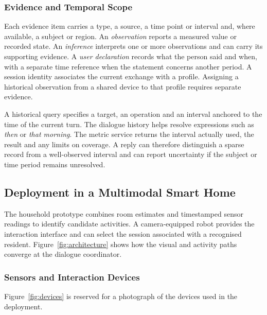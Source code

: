 \documentclass[a4paper,twoside]{article}
\begin{document}
\subsubsection{Evidence and Temporal Scope}
\label{subsec:evidence-method}

Each evidence item carries a type, a source, a time point or interval and, where available, a subject or region. An \emph{observation} reports a measured value or recorded state. An \emph{inference} interprets one or more observations and can carry its supporting evidence. A \emph{user declaration} records what the person said and when, with a separate time reference when the statement concerns another period. A session identity associates the current exchange with a profile. Assigning a historical observation from a shared device to that profile requires separate evidence.

A historical query specifies a target, an operation and an interval anchored to the time of the current turn. The dialogue history helps resolve expressions such as \emph{then} or \emph{that morning}. The metric service returns the interval actually used, the result and any limits on coverage. A reply can therefore distinguish a sparse record from a well-observed interval and can report uncertainty if the subject or time period remains unresolved.

\subsection{Deployment in a Multimodal Smart Home}

The household prototype combines room estimates and timestamped sensor readings to identify candidate activities. A camera-equipped robot provides the interaction interface and can select the session associated with a recognised resident. Figure~\ref{fig:architecture} shows how the visual and activity paths converge at the dialogue coordinator.

\subsubsection{Sensors and Interaction Devices}
\label{subsec:setup}

Figure~\ref{fig:devices} is reserved for a photograph of the devices used in the deployment.
\end{document}
